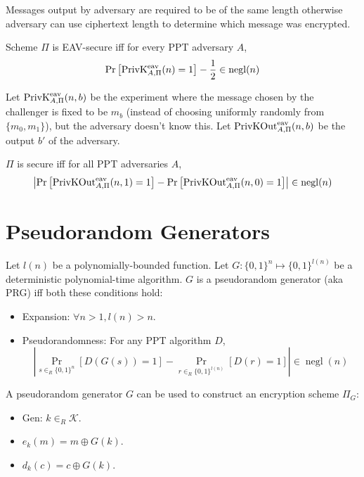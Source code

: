 Messages output by adversary are required to be of the same length
otherwise adversary can use ciphertext length to determine which message was encrypted.

\begin{definition}
Scheme $\Pi$ is EAV-secure iff for every PPT adversary $A$,
\[ \Pr\left[ \PrivKExpt{eav}{A,\Pi}(n) = 1\right] - \frac{1}{2}
\in \operatorname{negl}(n) \]
\end{definition}

\begin{definition}
Let $\PrivKExpt{eav}{A,\Pi}(n, b)$ be the experiment where the message chosen by the challenger
is fixed to be $m_b$ (instead of choosing uniformly randomly from $\{m_0, m_1\}$),
but the adversary doesn't know this.
Let $\PrivKOut{eav}{A,\Pi}(n, b)$ be the output $b'$ of the adversary.
\end{definition}

\begin{theorem}
$\Pi$ is secure iff for all PPT adversaries $A$,
\[ \left| \Pr\left[ \PrivKOut{eav}{A,\Pi}(n, 1) = 1 \right]
- \Pr\left[ \PrivKOut{eav}{A,\Pi}(n, 0) = 1 \right] \right| \in \operatorname{negl}(n) \]
\end{theorem}

\section{Pseudorandom Generators}

\begin{definition}
Let $l(n)$ be a polynomially-bounded function.
Let $G: \{0, 1\}^n \mapsto \{0, 1\}^{l(n)}$ be a deterministic polynomial-time algorithm.
$G$ is a pseudorandom generator (aka PRG) iff both these conditions hold:
\begin{itemize}
\item Expansion: $\forall n>1, l(n) > n$.
\item Pseudorandomness: For any PPT algorithm $D$,
\[ \left| \Pr_{s \in_R \{0, 1\}^n} [D(G(s))=1] - \Pr_{r \in_R \{0, 1\}^{l(n)}} [D(r)=1] \right|
\in \operatorname{negl}(n) \]
\end{itemize}
\end{definition}

A pseudorandom generator $G$ can be used to construct an encryption scheme $\Pi_G$:
\begin{itemize}
\item \textsf{Gen}: $k \in_R \mathcal{K}$.
\item $e_k(m) = m \oplus G(k)$.
\item $d_k(c) = c \oplus G(k)$.
\end{itemize}

